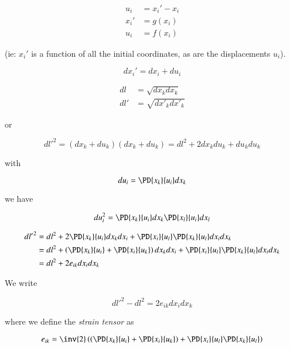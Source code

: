 \begin{align}\label{eqn:continuumL2:50}
u_i &= x_i' - x_i \\
x_i' &= g(x_i) \\
u_i &= f(x_i)
\end{align}

(ie: $x_i'$ is a function of all the initial coordinates, as are the displacements $u_i$).

\begin{equation}\label{eqn:continuumL2:70}
dx_i' = dx_i + du_i
\end{equation}

\begin{align}\label{eqn:continuumL2:90}
dl &= \sqrt{dx_k dx_k} \\
dl' &= \sqrt{d{x'}_k d{x'}_k}
\end{align}

or

\begin{equation}\label{eqn:continuumL2:110}
{dl'}^2 = 
(dx_k + du_k)
(dx_k + du_k)
= 
dl^2 + 2 dx_k du_k + du_k du_k
\end{equation}

with 

\begin{equation}\label{eqn:continuumL2:130}
du_i = \PD{x_k}{u_i} dx_k
\end{equation}

we have

\begin{equation}\label{eqn:continuumL2:150}
du_i^2 = 
\PD{x_k}{u_i} dx_k
\PD{x_l}{u_i} dx_l
\end{equation}

\begin{align*}
{dl'}^2 
&= 
dl^2 
+ 2 \PD{x_k}{u_i} dx_k dx_i 
+ \PD{x_i}{u_l} 
\PD{x_k}{u_l} 
dx_i dx_k \\
&= 
dl^2 
+ 
\left(
\PD{x_k}{u_i} 
+
\PD{x_i}{u_k} 
\right)
dx_k dx_i 
+ \PD{x_i}{u_l} 
\PD{x_k}{u_l} 
dx_i dx_k \\
&=
dl^2 
+ 
2 e_{ik} dx_i dx_k
\end{align*}

We write

\begin{equation}\label{eqn:continuumL2:170}
{dl'}^2 - dl^2 = 2 e_{ik} dx_i dx_k
\end{equation}

where we define the \emph{strain tensor} as

\begin{equation}\label{eqn:continuumL2:190}
e_{ik} = \inv{2} \left(
\left(
\PD{x_k}{u_i} 
+
\PD{x_i}{u_k} 
\right)
+ \PD{x_i}{u_l} 
\PD{x_k}{u_l} 
\right)
\end{equation}

